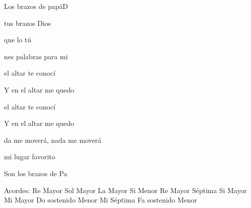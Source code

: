 \documentclass[12pt, spanish]{book}
\begin{document}
\begin{song}{Los brazos de papá}{D}
\begin{SBOpGroup}
             tus brazos Dios

            que lo tú

            nes palabras para mi
        \end{SBOpGroup}

        \begin{SBOpGroup}
             el altar te conocí

            Y en el altar me quedo

             el altar te conocí

            Y en el altar me quedo

            da me moverá, nada me moverá

             mi lugar favorito

            Son los brazos de Pa
        \end{SBOpGroup}

        \ifChordBk
        \begin{SBOpGroup}
            Acordes:
            \upchord{\D}\qquad Re Mayor \hfill
            \upchord{\G}\qquad Sol Mayor \hfill\null\break
            \upchord{\A}\qquad La Mayor \hfill
            \upchord{\Bm}\qquad Si Menor \hfill\null\break
            \upchord{\Dseven}\qquad Re Mayor S\'eptima \hfill
            \upchord{\B}\qquad Si Mayor \hfill\null\break
            \upchord{\E}\qquad Mi Mayor \hfill
            \upchord{\Csm}\qquad Do sostenido Menor \hfill\null\break
            \upchord{\Eseven}\qquad Mi S\'eptima \hfill
            \upchord{\Fsm}Fa sostenido Menor \hfill\null\break
        \end{SBOpGroup}
        \fi
    \end{song}
\end{document}

